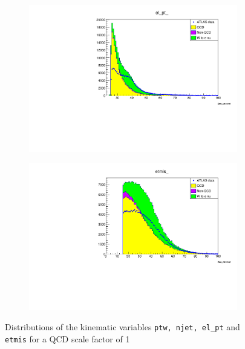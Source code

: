 \begin{figure}
\begin{subfigure}{0.5\textwidth}
        \includegraphics[width=\textwidth]{../W_mass/elpt_100_25_100_qcd1.pdf}
    \end{subfigure}
    \begin{subfigure}{0.5\textwidth}
        \includegraphics[width=\textwidth]{../W_mass/etmis_100_0_100_qcd1.pdf}
    \end{subfigure}
    \caption{Distributions of the kinematic variables \texttt{ptw, njet, el\_pt} and \texttt{etmis} for a QCD scale factor of 1}
    \label{fig:qcd1}
\end{figure}

